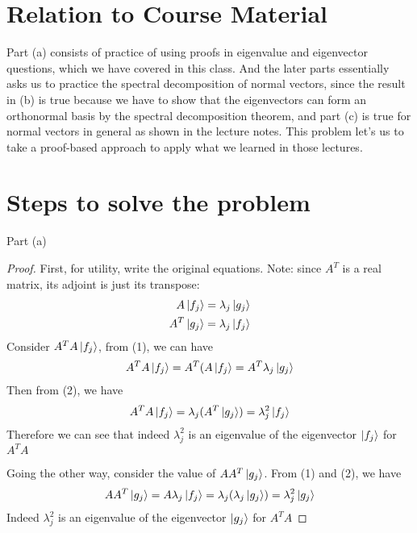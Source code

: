 \documentclass{article}
\begin{document}
\section{Relation to Course Material}

Part (a) consists of practice of using proofs in eigenvalue and eigenvector questions, which we have covered in this class. And the later parts essentially asks us to practice the spectral decomposition of normal vectors, since the result in (b) is true because we have to show that the eigenvectors can form an orthonormal basis by the spectral decomposition theorem, and part (c) is true for normal vectors in general as shown in the lecture notes. This problem let's us to take a proof-based approach to apply what we learned in those lectures.

\section{Steps to solve the problem}

Part (a)
\begin{proof}
    First, for utility, write the original equations. Note: since $A^T$ is a real matrix, its adjoint is just its transpose:
    \begin{align}
        A \ket{f_j} = \lambda_j \ket{g_j} \\
        A^T \ket{g_j} = \lambda_j \ket{f_j} \\
    \end{align}
    Consider $A^TA \ket{f_j}$, from (1), we can have
    \begin{align}
        A^TA \ket{f_j} = A^T(A\ket{f_j} = A^T \lambda_j \ket{g_j}
    \end{align}
    Then from (2), we have
    \begin{align}
        A^TA \ket{f_j} = \lambda_j (A^T \ket{g_j}) = \lambda^2_j \ket{f_j}
    \end{align}
    Therefore we can see that indeed $\lambda^2_j$ is an eigenvalue of the eigenvector $\ket{f_j}$ for $A^T A$
    
    Going the other way, consider the value of $AA^T \ket{g_j}$. From (1) and (2), we have
    \begin{align}
        AA^T \ket{g_j} = A \lambda_j \ket{f_j} = \lambda_j (\lambda_j \ket{g_j}) = \lambda^2_j \ket{g_j}
    \end{align}
    Indeed $\lambda^2_j$ is an eigenvalue of the eigenvector $\ket{g_j}$ for $A^T A$
\end{proof}
\end{document}
